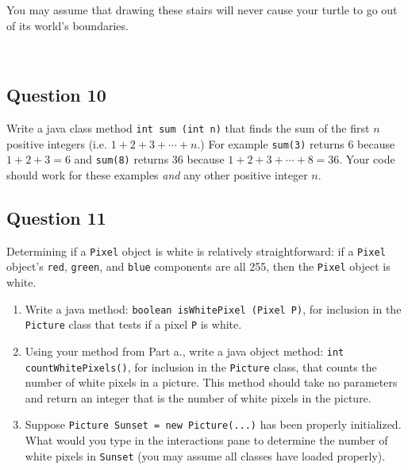 You may assume that drawing these stairs will never cause  your turtle to go out of its world's boundaries. 
\begin{center}
\\
\end{center}

\AnsBox{14cm}

\subsection*{Question 10}
Write a java class method \texttt{int sum (int n)} that finds the sum of the first $n$ positive integers (i.e. $1+2+3+\cdots+n.$) For example \texttt{sum(3)} returns $6$ because $1+2+3=6$ and \texttt{sum(8)} returns $36$ because $1+2+3+\cdots+8 = 36$. Your code should work for these examples \emph{and} any other positive integer $n$.\\

\AnsBox{18.5cm} \clearpage

\subsection*{Question 11}
Determining if a \texttt{Pixel} object is white is relatively straightforward: if a \texttt{Pixel} object's \texttt{red}, \texttt{green}, and \texttt{blue} components are all 255, then the \texttt{Pixel} object is white.

\begin{enumerate}
\item Write a java method: \texttt{boolean isWhitePixel (Pixel P)}, for inclusion in the \texttt{Picture} class that tests if a pixel \texttt{P} is white.\\

\hspace{-0.55cm}\AnsBox{18cm}

\item Using your method from Part a., write a java object method: \texttt{int countWhitePixels()}, for inclusion in the \texttt{Picture} class, that counts the number of white pixels in a picture. This method should take no parameters and return an integer that is the number of white pixels in the picture.\\

\hspace{-0.55cm}\AnsBox{14cm}

\item Suppose \texttt{Picture Sunset = new Picture(...)} has been properly initialized. What would you type in the interactions pane to determine the number of white pixels in \texttt{Sunset} (you may assume all classes have loaded properly).\\

\hspace{-0.55cm}\AnsBox{2cm}

\end{enumerate}
